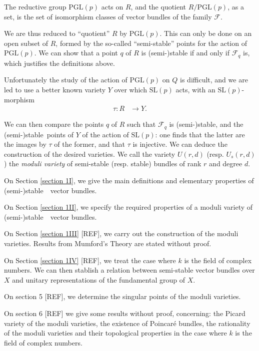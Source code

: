 \documentclass[12pt,a4paper]{book}
\def\FF{\mathscr{F}}
\def\PGL{\mathrm{PGL}}
\def\SL{\mathrm{SL}}
\def\ss{\mbox{(semi-)stable }}
\theoremstyle{definition} \newtheorem{defn}[thm]{Definition}
\theoremstyle{definition} \newtheorem{ejs}[thm]{Examples}
\theoremstyle{definition} \newtheorem{ej}[thm]{Example}
\begin{document}
The reductive group $\PGL(p)$ acts on $R$, and the quotient $R/\PGL(p)$, as a set, is the set of isomorphism classes of vector bundles of the family $\FF$.

We are thus reduced to ``quotient'' $R$ by $\PGL(p)$. This can only be done on an open subset of $R$, formed by the so-called ``semi-stable'' points for the action of $\PGL(p)$. We can show that a point $q$ of $R$ is (semi-)stable if and only if $\FF_q$ is, which justifies the definitions above.

Unfortunately the study of the action of $\PGL(p)$ on $Q$ is difficult, and we are led to use a better known variety $Y$ over which $\SL(p)$ acts, with an $\SL(p)$-morphism
\begin{align*}
  \tau :R &\longrightarrow Y. 
  \end{align*}

  We can then compare the points $q$ of $R$ such that $\FF_q$ is (semi-)stable, and the \ss points of $Y$ of the action of $\SL(p)$: one finds that the latter are the images by $\tau$ of the former, and that $\tau$ is injective. We can deduce the construction of the desired varieties. We call the variety $U(r,d)$ (resp. $U_s(r,d)$) the \emph{moduli variety} of semi-stable (resp. stable) bundles of rank $r$ and degree $d$.

  On Section \ref{section 1I}, we give the main definitions and elementary properties of \ss\ vector bundles.

  On Section \ref{section 1II}, we specify the required properties of a moduli variety of \ss\ vector bundles.

  On Section \ref{section 1III} [REF], we carry out the construction of the moduli varieties. Results from Mumford's Theory are stated without proof.

  On Section \ref{section 1IV} [REF], we treat the case where $k$ is the field of complex numbers. We can then stablish a relation between semi-stable vector bundles over $X$ and unitary representations of the fundamental group of $X$.

  On section 5 [REF], we determine the singular points of the moduli varieties.

  On section 6 [REF] we give some results without proof, concerning: the Picard variety of the moduli varieties, the existence of Poincaré bundles, the rationality of the moduli varieties and their topological properties in the case where $k$ is the field of complex numbers.
\end{document}
